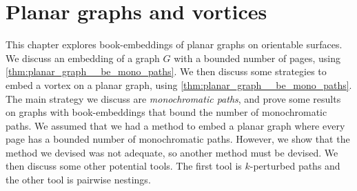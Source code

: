\chapter{Planar graphs and vortices}\label{chap:planar}

This chapter explores book-embeddings of planar graphs on orientable surfaces. 
We discuss an embedding of a graph $G$ with a bounded number of pages, using \cref{thm:planar_graph__be_mono_paths}. We then discuss some strategies to embed a vortex on a planar graph, using \cref{thm:planar_graph__be_mono_paths}. The main strategy we discuss are \textit{monochromatic paths}, and prove some results on graphs with book-embeddings that bound the number of monochromatic paths. We assumed that we had a method to embed a planar graph where every page has a bounded number of monochromatic paths. However, we show that the method we devised was not adequate, so another method must be devised. We then discuss some other potential tools. The first tool is $k$-perturbed paths and the other tool is pairwise nestings. 





